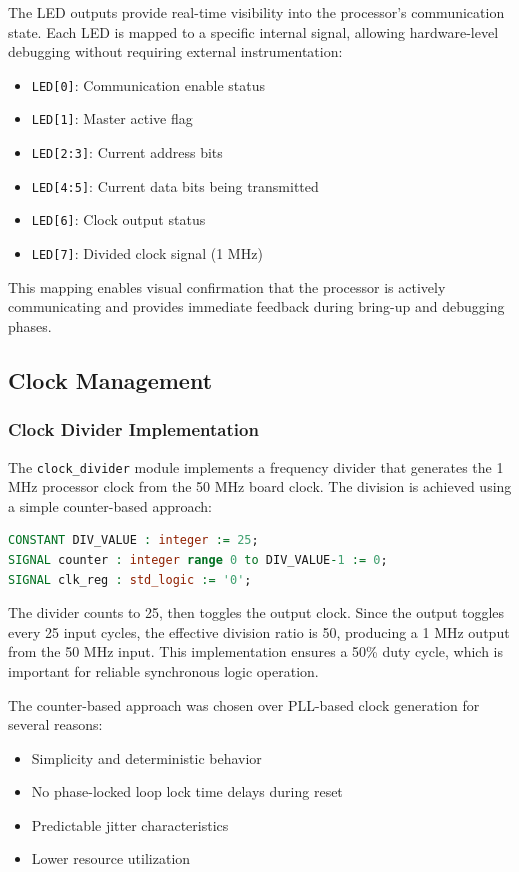 \documentclass[12pt]{article}
\begin{document}
The LED outputs provide real-time visibility into the processor's communication state. Each LED is mapped to a specific internal signal, allowing hardware-level debugging without requiring external instrumentation:

\begin{itemize}
    \item \texttt{LED[0]}: Communication enable status
    \item \texttt{LED[1]}: Master active flag
    \item \texttt{LED[2:3]}: Current address bits
    \item \texttt{LED[4:5]}: Current data bits being transmitted
    \item \texttt{LED[6]}: Clock output status
    \item \texttt{LED[7]}: Divided clock signal (1 MHz)
\end{itemize}

This mapping enables visual confirmation that the processor is actively communicating and provides immediate feedback during bring-up and debugging phases.

\subsection{Clock Management}

\subsubsection{Clock Divider Implementation}

The \texttt{clock\_divider} module implements a frequency divider that generates the 1 MHz processor clock from the 50 MHz board clock. The division is achieved using a simple counter-based approach:

\begin{lstlisting}[language=VHDL]
CONSTANT DIV_VALUE : integer := 25;
SIGNAL counter : integer range 0 to DIV_VALUE-1 := 0;
SIGNAL clk_reg : std_logic := '0';
\end{lstlisting}

The divider counts to 25, then toggles the output clock. Since the output toggles every 25 input cycles, the effective division ratio is 50, producing a 1 MHz output from the 50 MHz input. This implementation ensures a 50\% duty cycle, which is important for reliable synchronous logic operation.

The counter-based approach was chosen over PLL-based clock generation for several reasons:
\begin{itemize}
    \item Simplicity and deterministic behavior
    \item No phase-locked loop lock time delays during reset
    \item Predictable jitter characteristics
    \item Lower resource utilization
\end{itemize}
\end{document}
